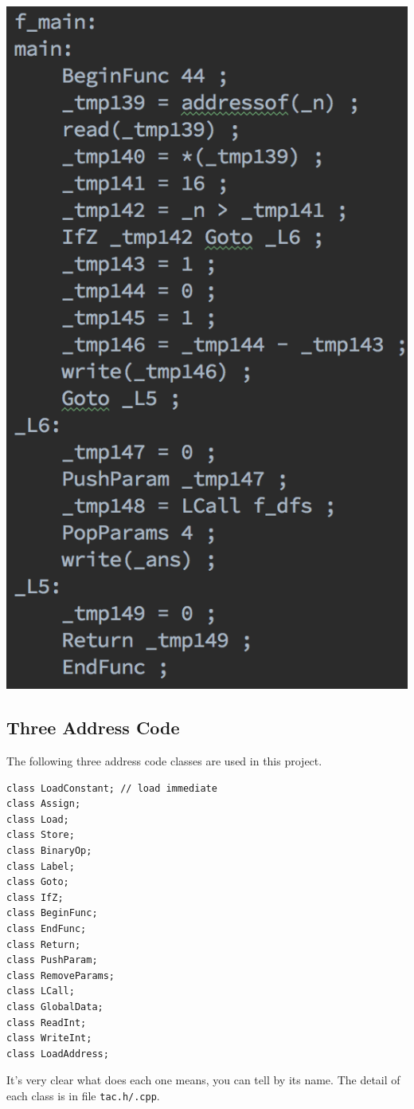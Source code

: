 \documentclass[11pt]{article}
\begin{document}
\includegraphics[width=.9\linewidth]{img/ir.png}

\subsection{Three Address Code}
\label{sec:orgheadline19}
The following three address code classes are used in this project.
\begin{verbatim}
class LoadConstant; // load immediate
class Assign;
class Load;
class Store;
class BinaryOp;
class Label;
class Goto;
class IfZ;
class BeginFunc;
class EndFunc;
class Return;
class PushParam;
class RemoveParams;
class LCall;
class GlobalData;
class ReadInt;
class WriteInt;
class LoadAddress;
\end{verbatim}
It's very clear what does each one means, you can tell by its name. The
detail of each class is in file \texttt{tac.h/.cpp}.
\end{document}
